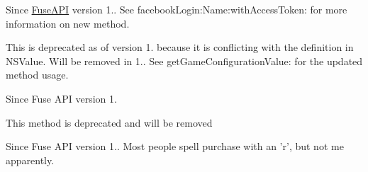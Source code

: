 
\begin{DoxyRefList}
\item[\label{deprecated__deprecated000004}%
\hypertarget{deprecated__deprecated000004}{}%
Global \hyperlink{interface_fuse_a_p_i_a04c181e3ec49e81ba081a5041df412f6}{\mbox{[}Fuse\+A\+P\+I facebook\+Login\+:\mbox{]}} ]Since \hyperlink{interface_fuse_a_p_i}{Fuse\+A\+P\+I} version 1.. See facebook\+Login\+:\+Name\+:with\+Access\+Token\+: for more information on new method.  
\item[\label{deprecated__deprecated000005}%
\hypertarget{deprecated__deprecated000005}{}%
Global \hyperlink{interface_fuse_a_p_i_a042146a8ed09eed1c05754016e922ced}{\mbox{[}Fuse\+A\+P\+I get\+Value\+:\mbox{]}} ]This is deprecated as of version 1. because it is conflicting with the definition in N\+S\+Value. Will be removed in 1.. See get\+Game\+Configuration\+Value\+: for the updated method usage.  
\item[\label{deprecated__deprecated000003}%
\hypertarget{deprecated__deprecated000003}{}%
Global \hyperlink{interface_fuse_a_p_i_a36deac5ef469d2f0e0b2f17fa2398a65}{\mbox{[}Fuse\+A\+P\+I register\+Event\+:\mbox{]}} ]Since Fuse A\+P\+I version 1.  
\item[\label{deprecated__deprecated000002}%
\hypertarget{deprecated__deprecated000002}{}%
Global \hyperlink{interface_fuse_a_p_i_aa37c46cc4e49f09fd9b2b40a548b61fc}{\mbox{[}Fuse\+A\+P\+I respond\+To\+Application\+Launch\+Options\+:Application\+:\mbox{]}} ]This method is deprecated and will be removed  
\item[\label{deprecated__deprecated000001}%
\hypertarget{deprecated__deprecated000001}{}%
Global \hyperlink{protocol_fuse_delegate-p_a588f6c19e418c6adbba67fd86c0b6515}{\mbox{[}Fuse\+Delegate-\/p puchase\+Verification\+:Transaction\+I\+D\+:Original\+Transaction\+I\+D\+:\mbox{]}} ]Since Fuse A\+P\+I version 1.. Most people spell purchase with an 'r', but not me apparently. 
\end{DoxyRefList}